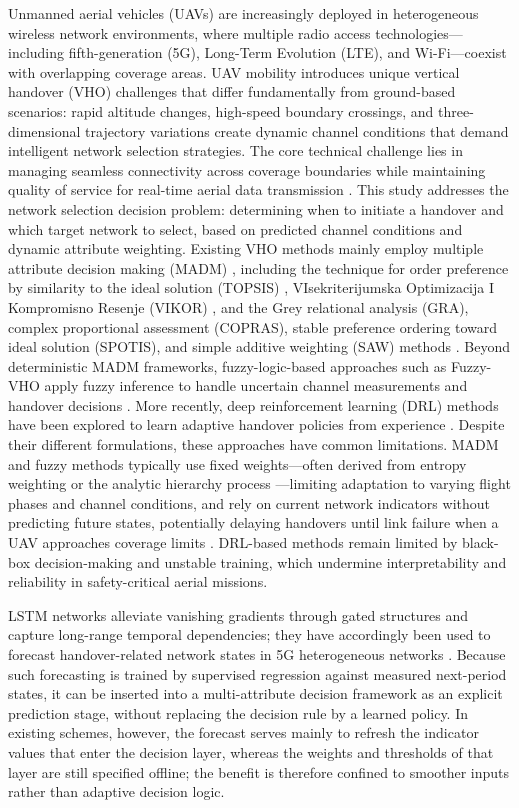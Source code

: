 \documentclass[preprint,12pt]{elsarticle}
\begin{document}
Unmanned aerial vehicles (UAVs) are increasingly deployed in heterogeneous wireless network environments, where multiple radio access technologies—including fifth-generation (5G), Long-Term Evolution (LTE), and Wi-Fi—coexist with overlapping coverage areas. UAV mobility introduces unique vertical handover (VHO) challenges that differ fundamentally from ground-based scenarios: rapid altitude changes, high-speed boundary crossings, and three-dimensional trajectory variations create dynamic channel conditions that demand intelligent network selection strategies. The core technical challenge lies in managing seamless connectivity across coverage boundaries while maintaining quality of service for real-time aerial data transmission \cite{ref1,ref2,ref3}. This study addresses the network selection decision problem: determining when to initiate a handover and which target network to select, based on predicted channel conditions and dynamic attribute weighting. Existing VHO methods mainly employ multiple attribute decision making (MADM) \cite{ref7}, including the technique for order preference by similarity to the ideal solution (TOPSIS) \cite{ref8,ref9,ref10}, VIsekriterijumska Optimizacija I Kompromisno Resenje (VIKOR) \cite{ref11}, and the Grey relational analysis (GRA), complex proportional assessment (COPRAS), stable preference ordering toward ideal solution (SPOTIS), and simple additive weighting (SAW) methods \cite{ref12}. Beyond deterministic MADM frameworks, fuzzy-logic-based approaches such as Fuzzy-VHO apply fuzzy inference to handle uncertain channel measurements and handover decisions \cite{ref4}. More recently, deep reinforcement learning (DRL) methods have been explored to learn adaptive handover policies from experience \cite{ref16,ref17,ref18}. Despite their different formulations, these approaches have common limitations. MADM and fuzzy methods typically use fixed weights—often derived from entropy weighting or the analytic hierarchy process \cite{ref12,ref13,ref14,ref15}—limiting adaptation to varying flight phases and channel conditions, and rely on current network indicators without predicting future states, potentially delaying handovers until link failure when a UAV approaches coverage limits \cite{ref16,ref17}. DRL-based methods remain limited by black-box decision-making and unstable training, which undermine interpretability and reliability in safety-critical aerial missions.

LSTM networks alleviate vanishing gradients through gated structures \cite{ref19} and capture long-range temporal dependencies; they have accordingly been used to forecast handover-related network states in 5G heterogeneous networks \cite{ref20,ref21,ref22}. Because such forecasting is trained by supervised regression against measured next-period states, it can be inserted into a multi-attribute decision framework as an explicit prediction stage, without replacing the decision rule by a learned policy. In existing schemes, however, the forecast serves mainly to refresh the indicator values that enter the decision layer, whereas the weights and thresholds of that layer are still specified offline; the benefit is therefore confined to smoother inputs rather than adaptive decision logic.
\end{document}
